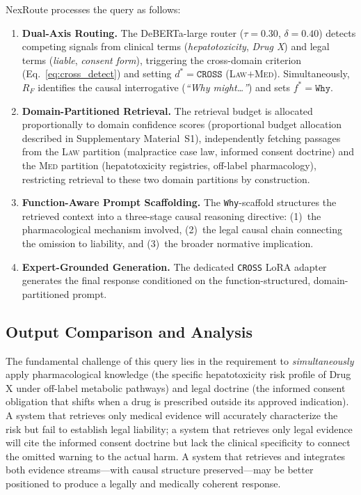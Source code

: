 \documentclass[a4paper,fleql,doubleblind]{cas-sc}
\begin{document}
NexRoute processes the query as follows:
\begin{enumerate}
    \item \textbf{Dual-Axis Routing.} The DeBERTa-large router
    ($\tau{=}0.30$, $\delta{=}0.40$) detects competing signals from clinical
    terms (\textit{hepatotoxicity}, \textit{Drug X}) and legal terms
    (\textit{liable}, \textit{consent form}), triggering the cross-domain
    criterion (Eq.~\ref{eq:cross_detect}) and setting $d^* = \texttt{CROSS}$
    (\textsc{Law}$+$\textsc{Med}). Simultaneously, $R_F$ identifies the causal
    interrogative (\textit{``Why might\ldots''}) and sets
    $f^* = \texttt{Why}$.

    \item \textbf{Domain-Partitioned Retrieval.} The retrieval budget is
    allocated proportionally to domain confidence scores
    (proportional budget allocation described in Supplementary Material~S1),
    independently fetching passages from the
    \textsc{Law} partition (malpractice case law, informed consent doctrine)
    and the \textsc{Med} partition (hepatotoxicity registries, off-label
    pharmacology), restricting retrieval to these two domain partitions by construction.

    \item \textbf{Function-Aware Prompt Scaffolding.} The \texttt{Why}-scaffold
    structures the retrieved context into a three-stage causal reasoning
    directive: (1)~the pharmacological mechanism involved, (2)~the legal causal
    chain connecting the omission to liability, and (3)~the broader normative
    implication.

    \item \textbf{Expert-Grounded Generation.} The dedicated \texttt{CROSS}
    LoRA adapter generates the final response conditioned on the
    function-structured, domain-partitioned prompt.
\end{enumerate}

\subsection{Output Comparison and Analysis}
\label{ssec:output}
The fundamental challenge of this query lies in the requirement to
\emph{simultaneously} apply pharmacological knowledge (the specific
hepatotoxicity risk profile of Drug X under off-label metabolic pathways) and
legal doctrine (the informed consent obligation that shifts when a drug is
prescribed outside its approved indication). A system that retrieves only
medical evidence will accurately characterize the risk but fail to establish
legal liability; a system that retrieves only legal evidence will cite the
informed consent doctrine but lack the clinical specificity to connect the
omitted warning to the actual harm. A system that retrieves and integrates both evidence streams---with causal
structure preserved---may be better positioned to produce a legally and
medically coherent response.
\end{document}
